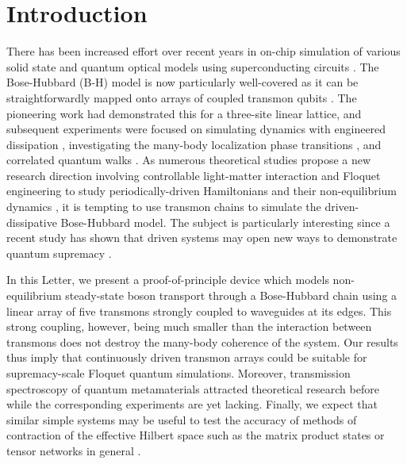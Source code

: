 \documentclass[%
 aps, pra,
 amsmath,amssymb,
 reprint,%
superscriptaddress
]{revtex4-2}
\begin{document}
\maketitle

\section{Introduction}


There has been increased effort over recent years in on-chip simulation of various solid state and quantum optical models using superconducting circuits \cite{kjaergaard2019superconducting}. The Bose-Hubbard (B-H) model is now particularly well-covered as it can be straightforwardly mapped onto arrays of coupled transmon qubits \cite{orell2019probing,yanay2020two}. The pioneering work \cite{hacohen2015cooling} had demonstrated this for a three-site linear lattice, and subsequent experiments were focused on simulating dynamics with engineered dissipation \cite{ma2019dissipatively}, investigating the many-body localization phase transitions \cite{roushan2017spectroscopic,chiaro2019growth}, and correlated quantum walks \cite{Yan2019, Ye2019}. As numerous theoretical studies propose a new research direction involving controllable light-matter interaction and Floquet engineering to study periodically-driven Hamiltonians and their non-equilibrium dynamics \cite{Goldman2014, eisert2015quantum, Zippilli2015, kyriienko2018floquet, franca2020simulating}, it is tempting to use transmon chains  to simulate the driven-dissipative Bose-Hubbard model. The subject is particularly interesting since a recent study has shown that driven systems may open new ways to demonstrate quantum supremacy \cite{tangpanitanon2019quantum}.

In this Letter, we present a proof-of-principle device which models non-equilibrium steady-state boson transport through a Bose-Hubbard chain using a linear array of five transmons strongly coupled to waveguides at its edges. This strong coupling, however, being much smaller than the interaction between transmons does not destroy the many-body coherence of the system. Our results thus imply that continuously driven transmon arrays could be suitable for supremacy-scale Floquet quantum simulations. Moreover, transmission spectroscopy of quantum metamaterials attracted theoretical research before \cite{Zagoskin2016, viehmann2013observing, Greenberg2015, Fistul2019, Biella2015,roberts2020driven, collodo2019observation} while the corresponding experiments are yet lacking. Finally, we expect that similar simple systems may be useful to test the accuracy of methods of contraction of the effective Hilbert space such as the matrix product states or tensor networks in general \cite{Biella2015, orell2019probing, di2019efficient}.
\end{document}
